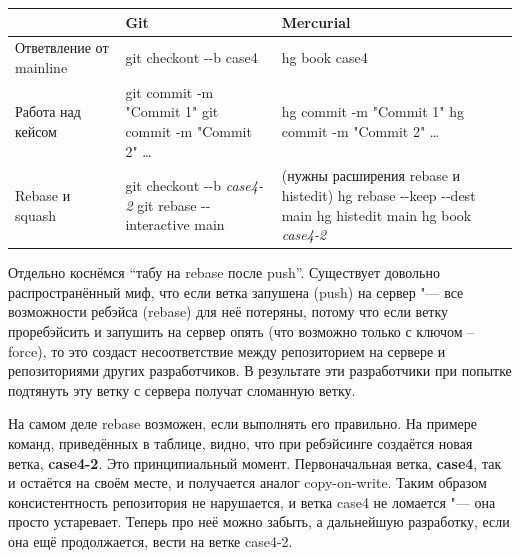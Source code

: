 \documentclass[10pt, a5paper]{article}
\begin{document}
\begin{table}
  \centering
  \begin{tabular}{P{2.5cm}|P{3.5cm}|P{3.5cm}}
    \hline
                                  ~  & \textbf{Git}                   & \textbf{Mercurial}          \\ \hline
    Ответвление от mainline          & git checkout -{}-b case4       & hg book case4              \\
    Работа над кейсом                & git commit -m "Commit 1" \newline
                                       git commit -m "Commit 2" \ldots{}
                                                                    & hg commit -m "Commit 1" \newline
                                                                      hg commit -m "Commit 2" \ldots{} \\
    Rebase и squash              & git checkout -{}-b \emph{case4-2} \newline
                                   git rebase -{}-interactive main
                                                     & (нужны расширения rebase и histedit) \newline
                                                       hg rebase -{}-keep -{}-dest main \newline
                                                       hg histedit main \newline
                                                       hg book \emph{case4-2}      \\
    \hline
  \end{tabular}
\end{table}
Отдельно коснёмся ``табу на rebase после push''. Существует довольно распространённый миф, что если ветка запушена (push) на сервер "--- все возможности ребэйса (rebase) для неё потеряны, потому что если ветку проребэйсить и запушить на сервер опять (что возможно только с ключом --force), то это создаст несоответствие между репозиторием на сервере и репозиториями других разработчиков. В результате эти разработчики при попытке подтянуть эту ветку с сервера получат сломанную ветку.

На самом деле rebase возможен, если выполнять его правильно. На примере команд, приведённых в таблице, видно, что при ребэйсинге создаётся новая ветка, \textbf{case4-2}. Это принципиальный момент. Первоначальная ветка, \textbf{case4}, так и остаётся на своём месте, и получается аналог copy-on-write. Таким образом консистентность репозитория не нарушается, и ветка case4 не ломается "--- она просто устаревает. Теперь про неё можно забыть, а дальнейшую разработку, если она ещё продолжается, вести на ветке case4-2.
\end{document}
